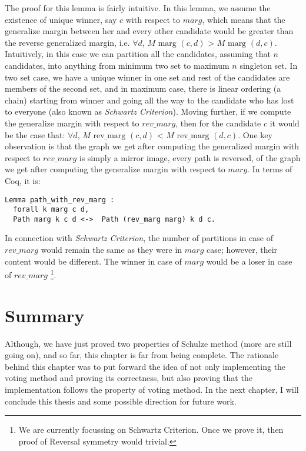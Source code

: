 The proof for this lemma is fairly intuitive. In this lemma, we assume the 
existence of unique winner, say $c$ with respect to $marg$, which means that the generalize 
margin between her and every other candidate would be greater than the reverse generalized 
margin, i.e.  $\forall d$, $M \text{ marg } (c, d)$ > $M \text{ marg } (d, c)$. 
Intuitively, in this case 
we can partition all the candidates, assuming that $n$ candidates, into anything  from minimum two set to maximum 
$n$ singleton set. In two set case, we have a unique winner in one set and rest of the candidates 
are members of the second set, and in maximum case, there is linear ordering (a chain) starting from winner 
and going all the way to the candidate who has lost to everyone (also known as \textit{Schwartz Criterion}).
Moving further, if we compute the generalize margin with respect to $rev\_marg$, then 
for the candidate $c$ it would be the case that:  $\forall d$, $M \text{ rev\_marg } (c, d)$ <  $M \text{ rev\_marg } (d, c)$. 
One key observation is that the graph we get after computing the generalized margin with respect to $rev\_marg$ is 
simply a mirror image, every path is reversed, of the graph we get after computing the generalize margin with respect to $marg$. 
In terms of Coq, it is:
\begin{verbatim}
Lemma path_with_rev_marg :
  forall k marg c d,
  Path marg k c d <->  Path (rev_marg marg) k d c.
\end{verbatim}


In connection with \textit{Schwartz Criterion}, the number of partitions in case of $rev\_marg$  
would remain the same as they were in $marg$ case;
however, their content would be different. The winner in case of $marg$ would be a loser in case of $rev\_marg$
\footnote{We are currently focussing on Schwartz Criterion. Once we prove it, then proof of Reversal symmetry would 
 trivial.}.


 	
 
 \section{Summary}
 Although, we have just proved two properties of Schulze method (more are still going on), and so far, this chapter 
 is far from being complete. The rationale behind this chapter was to put forward the idea of 
 not only implementing the voting method and proving its correctness, but also proving that the implementation 
 follows the property of voting method. In the next chapter, I will conclude this thesis and some possible 
 direction for future work.  
 
 
 
